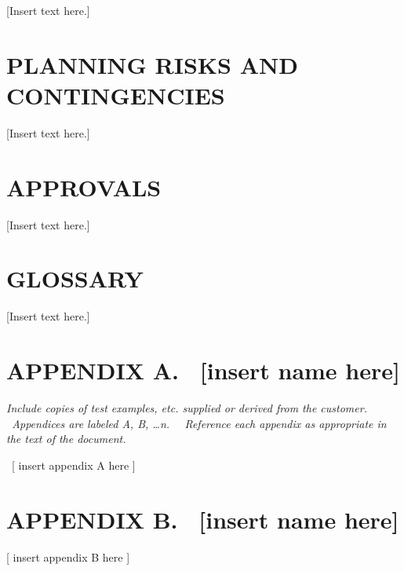 \documentclass[twoside,letterpaper]{article}
\begin{document}
[Insert text here.]

\section[PLANNING RISKS AND CONTINGENCIES]{\bfseries PLANNING RISKS AND CONTINGENCIES}

[Insert text here.]

\section[APPROVALS]{\bfseries APPROVALS}

[Insert text here.]

\section[GLOSSARY]
{\bfseries GLOSSARY}

[Insert text here.]


\clearpage\setcounter{page}{1}\pagestyle{Convertviii}
\section[APPENDIX A. \ [insert name here{]}]
{\bfseries APPENDIX A.
\ [insert name here]
}
{\itshape Include copies of test examples, etc. supplied or
derived from the customer. \ Appendices are labeled A, B, {\dots}n. \ \ Reference each appendix as appropriate in the text of the document. }

\ [ insert appendix A here ]

\clearpage\setcounter{page}{1}\pagestyle{Convertix}


\section[APPENDIX B. \ [insert name
here{]}]{\bfseries APPENDIX B.
\ [insert name here]
}

\bigskip

[ insert appendix B here ]


\bigskip
\end{document}
